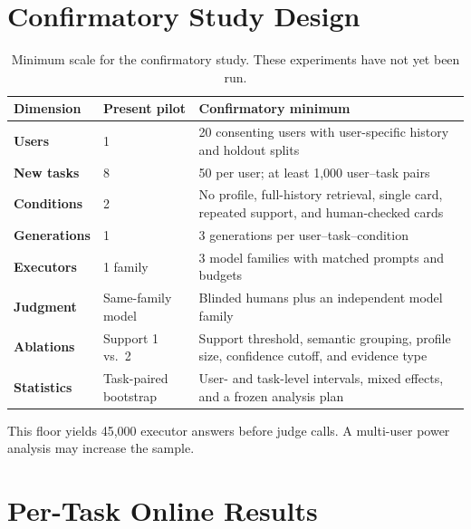 \documentclass{article}
\begin{document}
\section{Confirmatory Study Design}
\label{app:confirmatory}

\begin{table}[H]
\centering
\footnotesize
\caption{Minimum scale for the confirmatory study. These experiments have not
yet been run.}
\label{tab:confirmatory-design}
\setlength{\tabcolsep}{4pt}
\renewcommand{\arraystretch}{1.08}
\begin{tabularx}{\linewidth}{>{\bfseries}p{2.05cm}p{2.20cm}Y}
\toprule
{}
Dimension & Present pilot & Confirmatory minimum \\
\midrule
Users & 1 & 20 consenting users with user-specific history and holdout splits \\
New tasks & 8 & 50 per user; at least 1,000 user--task pairs \\
Conditions & 2 & No profile, full-history retrieval, single card, repeated
support, and human-checked cards \\
Generations & 1 & 3 generations per user--task--condition \\
Executors & 1 family & 3 model families with matched prompts and budgets \\
Judgment & Same-family model & Blinded humans plus an independent model family \\
Ablations & Support 1 vs.\ 2 & Support threshold, semantic grouping, profile
size, confidence cutoff, and evidence type \\
Statistics & Task-paired bootstrap & User- and task-level intervals, mixed
effects, and a frozen analysis plan \\
\bottomrule
\end{tabularx}
\end{table}

This floor yields 45,000 executor answers before judge calls. A multi-user
power analysis may increase the sample.

\section{Per-Task Online Results}
\label{app:tasks}
\end{document}
